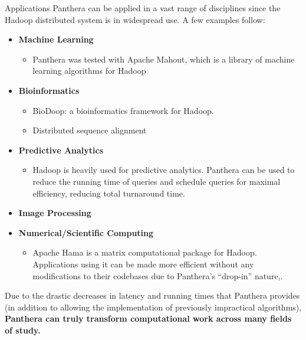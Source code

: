 \documentclass[final]{beamer} %
\begin{document}
\begin{frame}
\begin{columns}[t]
\begin{column}{0.32\textwidth}
	\begin{block}{Applications}
	Panthera can be applied in a vast range of disciplines since the Hadoop
	distributed system is in widespread use. A few examples follow: 
	\begin{itemize}
		\item \textbf{Machine Learning}
			\begin{itemize}
			\item Panthera was tested with Apache Mahout, which is a library of machine learning algorithms for Hadoop
			\end{itemize}
			
		\item \textbf{Bioinformatics}
			\begin{itemize}
				\item BioDoop: a bioinformatics framework for Hadoop.
				\item Distributed sequence alignment
			\end{itemize}
			
		\item \textbf{Predictive Analytics}	
			\begin{itemize}
				\item Hadoop is heavily used for predictive analytics. Panthera can
				be used to reduce the running time of queries and schedule queries
				for maximal efficiency, reducing total turnaround time.
			\end{itemize}
		\item \textbf{Image Processing}
		\item \textbf{Numerical/Scientific Computing}
		\begin{itemize}
			\item Apache Hama is a matrix computational package for Hadoop. Applications using it can be made more efficient without any modifications to their codebases due to Panthera's ``drop-in'' nature,.
			\end{itemize}
			
	\end{itemize}
	Due to the drastic decreases in latency and running times that Panthera provides
	(in addition to allowing the implementation of previously impractical algorithms), \textbf{Panthera can truly transform computational work across many
	fields of study.}
	\end{block}
	

\end{column}
\end{columns}
\end{frame}
\end{document}
